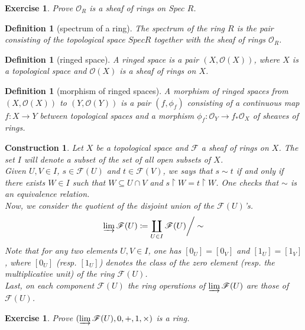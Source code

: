 \documentclass[12pt]{article}
\newtheorem{definition}[proposition]{Definition}
\newtheorem{ex}[proposition]{Exercise}
\newtheorem{construction}[proposition]{Construction}
\begin{document}
\begin{ex}
	Prove $\mathscr{O}_R$ is a sheaf of rings on Spec $R$. 
\end{ex}			

\begin{definition}[spectrum of a ring]
	The spectrum of the ring $R$ is the pair consisting of the topological space $Spec R$ together with the sheaf of rings $\mathscr{O}_R$.
\end{definition}

\begin{definition}[ringed space]
	A ringed space is a pair $(X, \mathscr{O}(X))$, where $X$ is a topological space and $\mathscr{O}(X)$ is a sheaf of rings on $X$.
\end{definition}

\begin{definition}[morphism of ringed spaces]
	A morphism of ringed spaces from $(X, \mathscr{O}(X))$ to $(Y, \mathscr{O}(Y))$ is a pair $(f, \phi_f)$ consisting of a continuous map $f: X \rightarrow Y$ between topological spaces and a morphism $\phi_f: \mathscr{O}_Y \rightarrow f_{*} \mathscr{O}_X$ of sheaves of rings.   
\end{definition}

\begin{construction}
	Let $X$ be a topological space and $\mathscr{F}$ a sheaf of rings on $X$. The set $I$ will denote a subset of the set of all open subsets of $X$. \\
	Given $U, V \in I$, $s \in \mathscr{F}(U)$ and $t \in \mathscr{F}(V)$,  we says that 
	$s \sim t$ if and only if there exists $W \in I$ such that $W \subseteq U \cap V$ and $s \restriction W = t \restriction W$. One checks that $\sim$ is an equivalence relation. \\
	Now, we consider the quotient of the disjoint union of the $\mathscr{F}(U)$'s.
	\[
	\varinjlim \mathscr{F}(U) \coloneqq \coprod_{U \in I} \mathscr{F}(U) \bigg/ \sim 
	\]
	Note that for any two elements $U, V \in I$, one has $[0_U] = [0_V]$ and $[1_U] = [1_V]$, where $[0_U]$ (\textit{resp.} $[1_U]$) denotes the class of the zero element (\textit{resp.} the multiplicative unit) of the ring $\mathscr{F}(U)$. \\
	Last, on each component $\mathscr{F}(U)$ the ring operations of $\varinjlim \mathscr{F}(U)$ are those of $\mathscr{F}(U)$. 
\end{construction}

\begin{ex}
	Prove $(\varinjlim \mathscr{F}(U), 0, +, 1, \times)$ is a ring. 
\end{ex}
\end{document}
